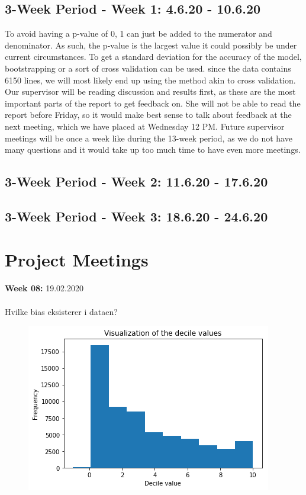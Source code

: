\documentclass[11pt, fleqn]{article}
\begin{document}
\subsection*{3-Week Period - Week 1: 4.6.20 - 10.6.20}
To avoid having a p-value of 0, 1 can just be added to the numerator and denominator. As such, the p-value is the largest value it could possibly be under current circumstances. To get a standard deviation for the accuracy of the model, bootstrapping or a sort of cross validation can be used. since the data contains 6150 lines, we will most likely end up using the method akin to cross validation.
Our supervisor will be reading discussion and results first, as these are the most important parts of the report to get feedback on. She will not be able to read the report before Friday, so it would make best sense to talk about feedback at the next meeting, which we have placed at Wednesday 12 PM.
Future supervisor meetings will be once a week like during the 13-week period, as we do not have many questions and it would take up too much time to have even more meetings.

\subsection*{3-Week Period - Week 2: 11.6.20 - 17.6.20}


\subsection*{3-Week Period - Week 3: 18.6.20 - 24.6.20}


		
\newpage
\newpage
\section*{Project Meetings}
	
	
	\textbf{Week 08:}  19.02.2020 \\\\
	\noindent
	Hvilke bias eksisterer i dataen? \\ 
	\begin{figure}[H]
		\centering
		\includegraphics[width=0.3\linewidth]{billeder/decil.png}
	\end{figure}
\end{document}
